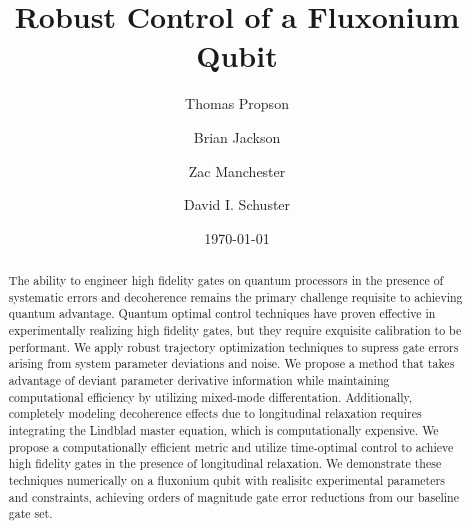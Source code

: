 \title{Robust Control of a Fluxonium Qubit}

\author{Thomas Propson}
\author{Brian Jackson}
\author{Zac Manchester}
\author{David I. Schuster}

\date{\today}

\begin{abstract}
  The ability to engineer high fidelity gates on quantum processors in the presence of
  systematic errors and decoherence remains the primary challenge requisite to achieving quantum advantage.
  Quantum optimal control techniques have proven effective in experimentally
  realizing high fidelity gates, but they require exquisite calibration to be performant.
  We apply robust trajectory optimization techniques to supress gate errors arising from system
  parameter deviations and noise.
  We propose a method that takes advantage of deviant parameter derivative information while maintaining
  computational efficiency by utilizing mixed-mode differentation.
  Additionally, completely modeling decoherence effects due to longitudinal relaxation requires
  integrating the Lindblad master equation, which is computationally expensive.
  We propose a computationally efficient metric
  and utilize time-optimal control to achieve high fidelity gates in the presence of longitudinal relaxation.
  We demonstrate these techniques numerically on a fluxonium qubit with realisitc
  experimental parameters and constraints,
  achieving orders of magnitude gate error reductions from our baseline gate set.
\end{abstract}
